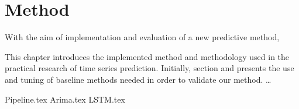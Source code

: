 \chapter{Method}
\label{section:Method}

With the aim of implementation and evaluation of a new predictive method, 

This chapter introduces the implemented method and methodology used in the practical research of time series prediction.
Initially, section  and  presents the use and tuning of baseline methods needed in order to validate our method.
\dots

{Pipeline.tex}
{Arima.tex}
{LSTM.tex}
